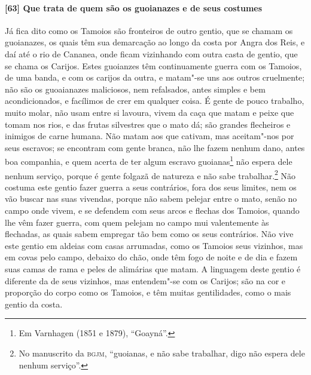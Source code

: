 \begin{linenumbers}
\paragraph{[63] Que trata de quem são os guoianazes e de seus costumes} \quad
Já fica dito como os Tamoios são fronteiros de outro gentio, que se chamam os guoianazes,
os quais têm sua demarcação ao longo da costa por Angra dos Reis, e daí até o rio de
Cananea, onde ficam vizinhando com outra casta de gentio, que se chama os Carijos. Estes
guoianzes têm continuamente guerra com os Tamoios, de uma banda, e com os carijos da
outra, e matam"-se uns aos outros cruelmente; não são os guoaianazes maliciosos, nem
refalsados, antes simples e bem acondicionados, e facílimos de crer em qualquer coisa. É
gente de pouco trabalho, muito molar, não usam entre si lavoura, vivem da caça que matam e
peixe que tomam nos rios, e das frutas silvestres que o mato dá; são grandes flecheiros e
inimigos de carne humana. Não matam aos que cativam, mas aceitam"-nos por seus escravos; se
encontram com gente branca, não lhe fazem nenhum dano, antes boa companhia, e quem acerta
de ter algum escravo guoianas\footnote{ Em Varnhagen (1851 e 1879), ``Goayná''.} não
espera dele nenhum serviço, porque é gente folgazã de natureza e não sabe
trabalhar.\footnote{ No manuscrito da \textsc{bgjm}, ``guoianas, e não sabe trabalhar,
digo não espera dele nenhum serviço''.} Não costuma este gentio fazer guerra a seus
contrários, fora dos seus limites, nem os vão buscar nas suas vivendas, porque não sabem
pelejar entre o mato, senão no campo onde vivem, e se defendem com seus arcos e flechas
dos Tamoios, quando lhe vêm fazer guerra, com quem pelejam no campo mui valentemente às
flechadas, as quais sabem empregar tão bem como os seus contrários. Não vive este gentio
em aldeias com casas arrumadas, como os Tamoios seus vizinhos, mas em covas pelo campo,
debaixo do chão, onde têm fogo de noite e de dia e fazem suas camas de rama e peles de
alimárias que matam. A linguagem deste gentio é diferente da de seus vizinhos, mas
entendem"-se com os Carijos; são na cor e proporção do corpo como os Tamoios, e têm muitas
gentilidades, como o mais gentio da costa.


\end{linenumbers}
